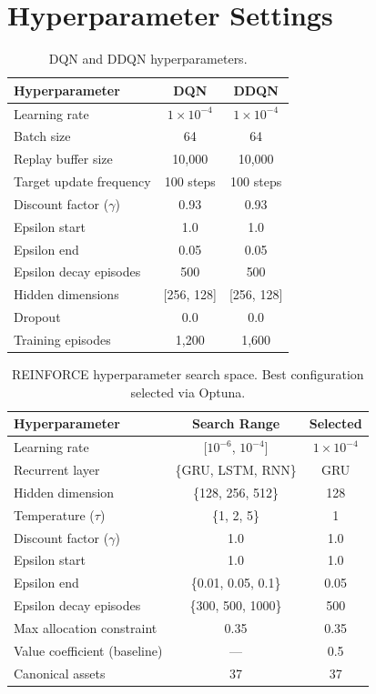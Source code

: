 
\section{Hyperparameter Settings}
\label{app:hyperparameters}

\begin{table}[htbp]
\centering
\caption{DQN and DDQN hyperparameters.}
\label{tab:dqn_hyperparams}
\begin{tabular}{lcc}
\toprule
\textbf{Hyperparameter} & \textbf{DQN} & \textbf{DDQN} \\
\midrule
Learning rate & $1 \times 10^{-4}$ & $1 \times 10^{-4}$ \\
Batch size & 64 & 64 \\
Replay buffer size & 10,000 & 10,000 \\
Target update frequency & 100 steps & 100 steps \\
Discount factor ($\gamma$) & 0.93 & 0.93 \\
Epsilon start & 1.0 & 1.0 \\
Epsilon end & 0.05 & 0.05 \\
Epsilon decay episodes & 500 & 500 \\
Hidden dimensions & [256, 128] & [256, 128] \\
Dropout & 0.0 & 0.0 \\
Training episodes & 1,200 & 1,600 \\
\bottomrule
\end{tabular}
\end{table}

\begin{table}[htbp]
\centering
\caption{REINFORCE hyperparameter search space. Best configuration selected via Optuna.}
\label{tab:reinforce_hyperparams}
\begin{tabular}{lcc}
\toprule
\textbf{Hyperparameter} & \textbf{Search Range} & \textbf{Selected} \\
\midrule
Learning rate & [$10^{-6}$, $10^{-4}$] & $1 \times 10^{-4}$ \\
Recurrent layer & \{GRU, LSTM, RNN\} & GRU \\
Hidden dimension & \{128, 256, 512\} & 128 \\
Temperature ($\tau$) & \{1, 2, 5\} & 1 \\
Discount factor ($\gamma$) & 1.0 & 1.0 \\
Epsilon start & 1.0 & 1.0 \\
Epsilon end & \{0.01, 0.05, 0.1\} & 0.05 \\
Epsilon decay episodes & \{300, 500, 1000\} & 500 \\
Max allocation constraint & 0.35 & 0.35 \\
Value coefficient (baseline) & --- & 0.5 \\
Canonical assets & 37 & 37 \\
\bottomrule
\end{tabular}
\end{table}

